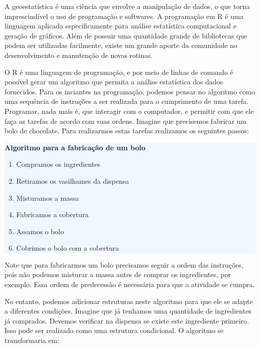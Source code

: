 A geoestatística é uma ciência que envolve a manipulação de dados, o que torna imprescindível o uso de programação e softwares. A programação em R é uma linguagem aplicada especificamente para análise estatística computacional e geração de gráficos. Além de possuir uma quantidade grande de bibliotecas que podem ser utilizadas facilmente, existe um grande aporte da comunidade no desenvolvimento e manutenção de novas rotinas. 

O R é uma linguagem de programação, e por meio de linhas de comando é possível gerar um algoritmo que permita a análise estatística dos dados fornecidos. Para os inciantes na programação, podemos pensar no algoritmo como uma sequência de instruções a ser realizada para o cumprimento de uma tarefa. Programar, nada mais é, que interagir com  o computador, e permitir com que ele faça as tarefas de acordo com suas ordens. Imagine que precisemos fabricar um bolo de chocolate. Para realizarmos estas tarefas realizamos os seguintes passos: 


\vspace{0.5cm}
\colorbox{aliceblue}{\begin{minipage}{\textwidth}
\textbf{Algoritmo para a fabricação de um bolo} 
\begin{enumerate}
	\item Compramos os ingredientes 
	\item Retiramos os vasilhames da dispensa 
	\item Misturamos a massa 
	\item Fabricamos a cobertura 
	\item Assamos o bolo 
	\item Cobrimos o bolo com a cobertura
\end{enumerate} 
\end{minipage}}
\vspace{0.5cm}


Note que para fabricarmos um bolo precisamos seguir a ordem das instruções, pois não podemos misturar a massa antes de comprar os ingredientes, por exemplo. Essa ordem de predecessão é necessária para que a atividade se cumpra. 

No entanto, podemos adicionar estruturas neste algoritmo para que ele se adapte a diferentes condições. Imagine que já tenhamos uma quantidade de ingredientes já comprados. Devemos verificar na dispensa se existe este ingrediente primeiro. Isso pode ser realizado como uma estrutura condicional. O algoritmo se transformaria em: 


